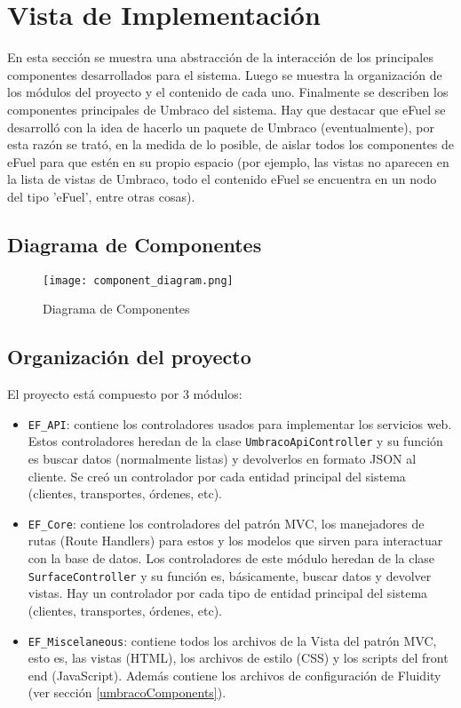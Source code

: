 \section{Vista de Implementación} \label{vistaImplementacion}
En esta sección se muestra una abstracción de la interacción de los principales componentes desarrollados para el sistema. Luego se muestra la organización de los módulos del proyecto y el contenido de cada uno. Finalmente se describen los componentes principales de Umbraco del sistema. Hay que destacar que eFuel se desarrolló con la idea de hacerlo un paquete de Umbraco (eventualmente), por esta razón se trató, en la medida de lo posible, de aislar todos los componentes de eFuel para que estén en su propio espacio (por ejemplo, las vistas no aparecen en la lista de vistas de Umbraco, todo el contenido eFuel se encuentra en un nodo del tipo 'eFuel', entre otras cosas).

\subsection{Diagrama de Componentes}

\begin{figure}[H]
    \texttt{[image: component\_diagram.png]}
    \caption{Diagrama de Componentes}
    \label{fig:component_diagram}
    \centering
\end{figure}

\subsection{Organización del proyecto}
El proyecto está compuesto por 3 módulos:

\begin{itemize}
    \item \verb|EF_API|: contiene los controladores usados para implementar los servicios web. Estos controladores heredan de la clase \verb|UmbracoApiController| y su función es buscar datos (normalmente listas) y devolverlos en formato JSON al cliente. Se creó un controlador por cada entidad principal del sistema (clientes, transportes, órdenes, etc).
    \item \verb|EF_Core|: contiene los controladores del patrón MVC, los manejadores de rutas (Route Handlers) para estos y los modelos que sirven para interactuar con la base de datos. Los controladores de este módulo heredan de la clase \verb|SurfaceController| y su función es, básicamente, buscar datos y devolver vistas. Hay un controlador por cada tipo de entidad principal del sistema (clientes, transportes, órdenes, etc).
    \item \verb|EF_Miscelaneous|: contiene todos los archivos de la Vista del patrón MVC, esto es, las vistas (HTML), los archivos de estilo (CSS) y los scripts del front end (JavaScript). Además contiene los archivos de configuración de Fluidity (ver sección \ref{umbracoComponents}).
\end{itemize}

